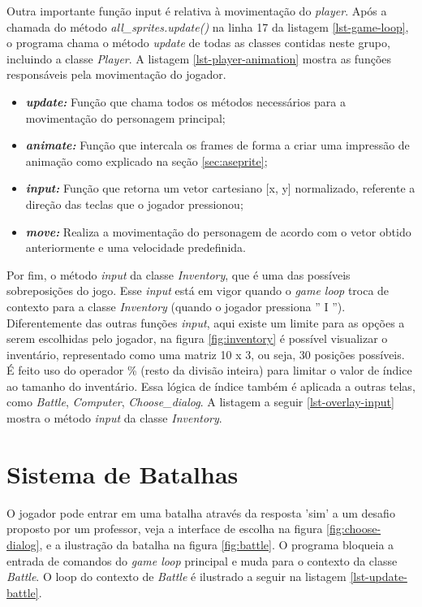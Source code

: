 Outra importante função input é relativa à  movimentação do \textit{player}. Após a chamada do método \textit{all\_sprites.update()} na linha 17 da listagem \ref{lst-game-loop}, o programa chama o método \textit{update} de todas as classes contidas neste grupo, incluindo a classe \textit{Player}. A listagem \ref{lst-player-animation} mostra as funções responsáveis pela movimentação do jogador.


\begin{itemize}
    \item \textit{\textbf{update:}} Função que chama todos os métodos necessários para a movimentação do personagem principal;
    \item \textit{\textbf{animate:}} Função que intercala os frames de forma a criar uma impressão de animação como explicado na seção \ref{sec:aseprite};
    \item \textit{\textbf{input:}} Função que retorna um vetor cartesiano [x, y] normalizado, referente a direção das teclas que o jogador pressionou;
    \item \textit{\textbf{move:}} Realiza a movimentação do personagem de acordo com o vetor obtido anteriormente e uma velocidade predefinida.
\end{itemize}

Por fim, o método \textit{input} da classe \textit{Inventory},  que é uma das possíveis sobreposições do jogo. Esse \textit{input} está em vigor quando o \textit{game loop} troca de contexto para a classe \textit{Inventory} (quando o jogador pressiona '' I ''). Diferentemente das outras funções \textit{input}, aqui existe um limite para as opções a serem escolhidas pelo jogador, na figura \ref{fig:inventory} é possível visualizar o inventário, representado como uma matriz 10 x 3, ou seja, 30 posições possíveis. É feito uso do operador \% (resto da divisão inteira) para limitar o valor de índice ao tamanho do inventário. Essa lógica de índice também é aplicada a outras telas, como \textit{Battle}, \textit{Computer}, \textit{Choose\_dialog}. A listagem a seguir \ref{lst-overlay-input} mostra o método \textit{input} da classe \textit{Inventory}. 





\clearpage
\section{Sistema de Batalhas}
O jogador pode entrar em uma batalha através da resposta 'sim' a um desafio proposto por um professor, veja a interface de escolha na figura \ref{fig:choose-dialog}, e a ilustração da batalha na figura \ref{fig:battle}. O programa bloqueia a entrada de comandos do \textit{game loop} principal e muda para o contexto da classe \textit{Battle}. O loop do contexto de \textit{Battle} é ilustrado a seguir na listagem \ref{lst-update-battle}.

